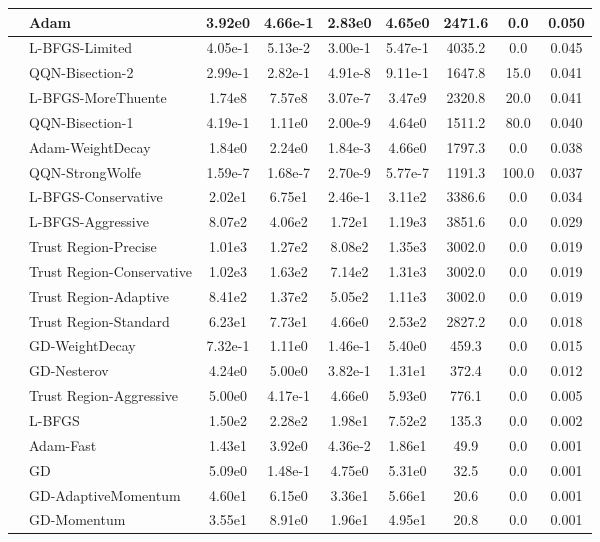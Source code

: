 \documentclass[10pt]{article}
\begin{document}
\begin{longtable}{|l|l|c|c|c|c|c|c|c|}
\hline
 & Adam & 3.92e0 & 4.66e-1 & 2.83e0 & 4.65e0 & 2471.6 & 0.0 & 0.050 \\
\hline
 & L-BFGS-Limited & 4.05e-1 & 5.13e-2 & 3.00e-1 & 5.47e-1 & 4035.2 & 0.0 & 0.045 \\
\hline
 & QQN-Bisection-2 & 2.99e-1 & 2.82e-1 & 4.91e-8 & 9.11e-1 & 1647.8 & 15.0 & 0.041 \\
\hline
 & L-BFGS-MoreThuente & 1.74e8 & 7.57e8 & 3.07e-7 & 3.47e9 & 2320.8 & 20.0 & 0.041 \\
\hline
 & QQN-Bisection-1 & 4.19e-1 & 1.11e0 & 2.00e-9 & 4.64e0 & 1511.2 & 80.0 & 0.040 \\
\hline
 & Adam-WeightDecay & 1.84e0 & 2.24e0 & 1.84e-3 & 4.66e0 & 1797.3 & 0.0 & 0.038 \\
\hline
 & QQN-StrongWolfe & 1.59e-7 & 1.68e-7 & 2.70e-9 & 5.77e-7 & 1191.3 & 100.0 & 0.037 \\
\hline
 & L-BFGS-Conservative & 2.02e1 & 6.75e1 & 2.46e-1 & 3.11e2 & 3386.6 & 0.0 & 0.034 \\
\hline
 & L-BFGS-Aggressive & 8.07e2 & 4.06e2 & 1.72e1 & 1.19e3 & 3851.6 & 0.0 & 0.029 \\
\hline
 & Trust Region-Precise & 1.01e3 & 1.27e2 & 8.08e2 & 1.35e3 & 3002.0 & 0.0 & 0.019 \\
\hline
 & Trust Region-Conservative & 1.02e3 & 1.63e2 & 7.14e2 & 1.31e3 & 3002.0 & 0.0 & 0.019 \\
\hline
 & Trust Region-Adaptive & 8.41e2 & 1.37e2 & 5.05e2 & 1.11e3 & 3002.0 & 0.0 & 0.019 \\
\hline
 & Trust Region-Standard & 6.23e1 & 7.73e1 & 4.66e0 & 2.53e2 & 2827.2 & 0.0 & 0.018 \\
\hline
 & GD-WeightDecay & 7.32e-1 & 1.11e0 & 1.46e-1 & 5.40e0 & 459.3 & 0.0 & 0.015 \\
\hline
 & GD-Nesterov & 4.24e0 & 5.00e0 & 3.82e-1 & 1.31e1 & 372.4 & 0.0 & 0.012 \\
\hline
 & Trust Region-Aggressive & 5.00e0 & 4.17e-1 & 4.66e0 & 5.93e0 & 776.1 & 0.0 & 0.005 \\
\hline
 & L-BFGS & 1.50e2 & 2.28e2 & 1.98e1 & 7.52e2 & 135.3 & 0.0 & 0.002 \\
\hline
 & Adam-Fast & 1.43e1 & 3.92e0 & 4.36e-2 & 1.86e1 & 49.9 & 0.0 & 0.001 \\
\hline
 & GD & 5.09e0 & 1.48e-1 & 4.75e0 & 5.31e0 & 32.5 & 0.0 & 0.001 \\
\hline
 & GD-AdaptiveMomentum & 4.60e1 & 6.15e0 & 3.36e1 & 5.66e1 & 20.6 & 0.0 & 0.001 \\
\hline
 & GD-Momentum & 3.55e1 & 8.91e0 & 1.96e1 & 4.95e1 & 20.8 & 0.0 & 0.001 \\

\end{longtable}
\end{document}
